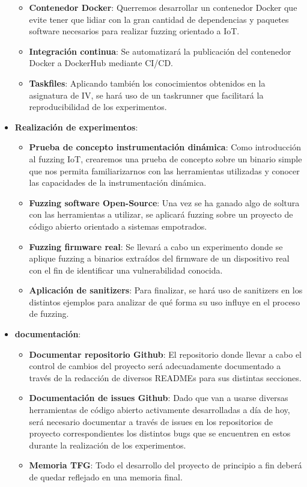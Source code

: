 \begin{itemize}
\begin{itemize}
        \item \textbf{Contenedor Docker}: Querremos desarrollar un contenedor Docker que evite tener que lidiar con la gran cantidad de dependencias 
        y paquetes software necesarios para realizar fuzzing orientado a IoT.
        \item \textbf{Integración continua}: Se automatizará la publicación del contenedor Docker a DockerHub mediante CI/CD.
        \item \textbf{Taskfiles}: Aplicando también los conocimientos obtenidos en la asignatura de IV, se hará uso de un taskrunner que 
        facilitará la reproducibilidad de los experimentos. 
    \end{itemize}
    \item \textbf{Realización de experimentos}:
    \begin{itemize}
        \item \textbf{Prueba de concepto instrumentación dinámica}: Como introducción al fuzzing IoT, crearemos una prueba de concepto sobre
        un binario simple que nos permita familiarizarnos con las herramientas utilizadas y conocer las capacidades de la instrumentación dinámica.
        \item \textbf{Fuzzing software Open-Source}: Una vez se ha ganado algo de soltura con las herramientas a utilizar, se aplicará fuzzing 
        sobre un proyecto de código abierto orientado a sistemas empotrados.
        \item \textbf{Fuzzing firmware real}: Se llevará a cabo un experimento donde se aplique fuzzing a binarios extraídos del firmware de un 
        dispositivo real con el fin de identificar una vulnerabilidad conocida. 
        \item \textbf{Aplicación de sanitizers}: Para finalizar, se hará uso de sanitizers en los distintos ejemplos para analizar de qué forma 
        su uso influye en el proceso de fuzzing.
    \end{itemize}
    \item \textbf{documentación}:
    \begin{itemize}
        \item \textbf{Documentar repositorio Github}: El repositorio donde llevar a cabo el control de cambios del proyecto será 
        adecuadamente documentado a través de la redacción de diversos READMEs para sus distintas secciones.
        \item \textbf{Documentación de issues Github}: Dado que van a usarse diversas herramientas de código abierto activamente 
        desarrolladas a día de hoy, será necesario documentar a través de issues en los repositorios de proyecto correspondientes
        los distintos bugs que se encuentren en estos durante la realización de los experimentos.
        \item \textbf{Memoria TFG}: Todo el desarrollo del proyecto de principio a fin deberá de quedar reflejado en una memoria final.
    \end{itemize}
\end{itemize}

